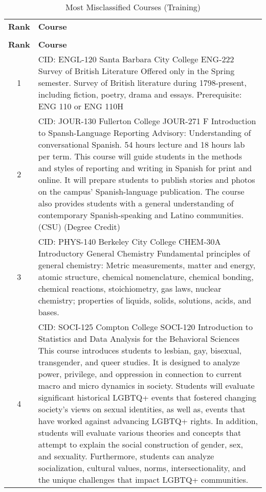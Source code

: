 \begin{longtable}{ >{\baselineskip=12pt}c >{\baselineskip=12pt}p{} }
\captionsetup{skip=5pt}
\caption{Most Misclassified Courses (Training)}\label{tab:fp_overlap_training}\\
\toprule
\textbf{\textbf{Rank}} & \textbf{\textbf{Course}} \\
\midrule
\endfirsthead
\caption[]{Most Misclassified Courses (Training)}\\
\toprule
\textbf{\textbf{Rank}} & \textbf{\textbf{Course}} \\
\midrule
\endhead
1 & CID: ENGL-120 \newline
Santa Barbara City College \newline
ENG-222 Survey of British Literature \newline
Offered only in the Spring semester. Survey of British literature during 1798-present, including fiction, poetry, drama and essays. Prerequisite: ENG 110 or ENG 110H\\
\midrule
2 & CID: JOUR-130 \newline
Fullerton College \newline
JOUR-271 F Introduction to Spansh-Language Reporting \newline
Advisory: Understanding of conversational Spanish. 54 hours lecture and 18 hours lab per term. This course will guide students in the methods and styles of reporting and writing in Spanish for print and online. It will prepare students to publish stories and photos on the campus' Spanish-language publication. The course also provides students with a general understanding of contemporary Spanish-speaking and Latino communities. (CSU) (Degree Credit)\\
\midrule
3 & CID: PHYS-140 \newline
Berkeley City College \newline
CHEM-30A Introductory General Chemistry \newline
Fundamental principles of general chemistry: Metric measurements, matter and energy, atomic structure, chemical nomenclature, chemical bonding, chemical reactions, stoichiometry, gas laws, nuclear chemistry; properties of liquids, solids, solutions, acids, and bases.\\
\midrule
4 & CID: SOCI-125 \newline
Compton College \newline
SOCI-120 Introduction to Statistics and Data Analysis for the Behavioral Sciences \newline
This course introduces students to lesbian, gay, bisexual, transgender, and queer studies. It is designed to analyze power, privilege, and oppression in connection to current macro and micro dynamics in society. Students will evaluate significant historical LGBTQ+ events that fostered changing society's views on sexual identities, as well as, events that have worked against advancing LGBTQ+ rights. In addition, students will evaluate various theories and concepts that attempt to explain the social construction of gender, sex, and sexuality. Furthermore, students can analyze socialization, cultural values, norms, intersectionality, and the unique challenges that impact LGBTQ+ communities.\\

\end{longtable}
